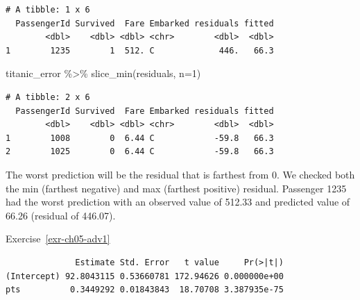 \documentclass[
  letterpaper,
  DIV=11,
  numbers=noendperiod]{scrreprt}
\newenvironment{Shaded}{\begin{snugshade}}{\end{snugshade}}
\newcommand{\AttributeTok}[1]{\textcolor[rgb]{0.40,0.45,0.13}{#1}}
\newcommand{\CommentTok}[1]{\textcolor[rgb]{0.37,0.37,0.37}{#1}}
\newcommand{\DecValTok}[1]{\textcolor[rgb]{0.68,0.00,0.00}{#1}}
\newcommand{\FunctionTok}[1]{\textcolor[rgb]{0.28,0.35,0.67}{#1}}
\newcommand{\NormalTok}[1]{\textcolor[rgb]{0.00,0.23,0.31}{#1}}
\newcommand{\SpecialCharTok}[1]{\textcolor[rgb]{0.37,0.37,0.37}{#1}}
\theoremstyle{definition}
\theoremstyle{remark}
\begin{document}
\begin{verbatim}
# A tibble: 1 x 6
  PassengerId Survived  Fare Embarked residuals fitted
        <dbl>    <dbl> <dbl> <chr>        <dbl>  <dbl>
1        1235        1  512. C             446.   66.3
\end{verbatim}

\begin{Shaded}
\begin{Highlighting}[]
\NormalTok{titanic\_error }\SpecialCharTok{\%\textgreater{}\%} 
  \FunctionTok{slice\_min}\NormalTok{(residuals, }\AttributeTok{n=}\DecValTok{1}\NormalTok{)}
\end{Highlighting}
\end{Shaded}

\begin{verbatim}
# A tibble: 2 x 6
  PassengerId Survived  Fare Embarked residuals fitted
        <dbl>    <dbl> <dbl> <chr>        <dbl>  <dbl>
1        1008        0  6.44 C            -59.8   66.3
2        1025        0  6.44 C            -59.8   66.3
\end{verbatim}

The worst prediction will be the residual that is farthest from 0. We
checked both the min (farthest negative) and max (farthest positive)
residual. Passenger 1235 had the worst prediction with an observed value
of 512.33 and predicted value of 66.26 (residual of 446.07).

Exercise~\ref{exr-ch05-adv1}

\begin{Shaded}
\end{Shaded}

\begin{verbatim}
              Estimate Std. Error   t value     Pr(>|t|)
(Intercept) 92.8043115 0.53660781 172.94626 0.000000e+00
pts          0.3449292 0.01843843  18.70708 3.387935e-75
\end{verbatim}

\begin{Shaded}
\end{Shaded}
\end{document}
